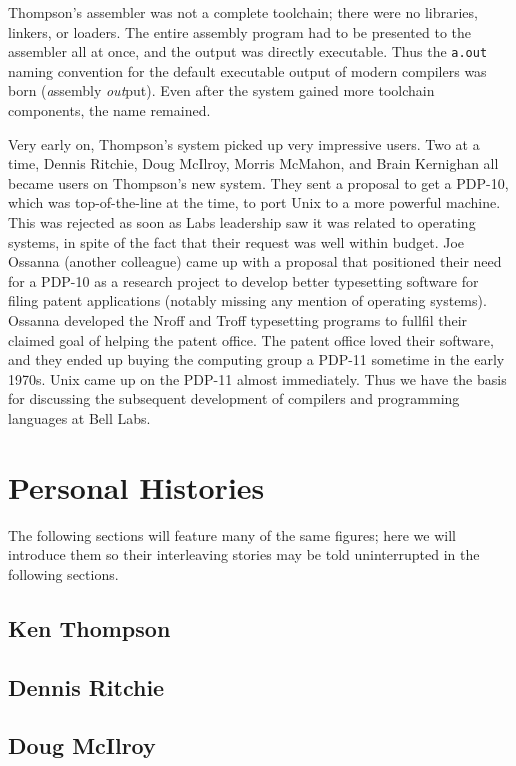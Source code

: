 Thompson's assembler was not a complete toolchain; there were no libraries, linkers, or loaders.
The entire assembly program had to be presented to the assembler all at once,
and the output was directly executable. Thus the \texttt{a.out} naming convention for
the default executable output of modern compilers was born (\textit{a}ssembly \textit{out}put).
Even after the system gained more toolchain components, the name remained.

Very early on, Thompson's system picked up very impressive users.
Two at a time, Dennis Ritchie, Doug McIlroy, Morris McMahon, and Brain Kernighan
all became users on Thompson's new system.
They sent a proposal to get a PDP-10, which was top-of-the-line at the time,
to port Unix to a more powerful machine.
This was rejected as soon as Labs leadership saw it was related to operating systems,
in spite of the fact that their request was well within budget.
Joe Ossanna (another colleague) came up with a proposal that
positioned their need for a PDP-10 as a research project to develop better typesetting
software for filing patent applications (notably missing any mention of operating
systems).
Ossanna developed the Nroff and Troff typesetting programs to fullfil their claimed
goal of helping the patent office.
The patent office loved their software, and they ended up buying the computing group
a PDP-11 sometime in the early 1970s.
Unix came up on the PDP-11 almost immediately.
Thus we have the basis for discussing the subsequent development of compilers
and programming languages at Bell Labs.

\section{Personal Histories}

The following sections will feature many of the same figures;
here we will introduce them so their interleaving stories may be told
uninterrupted in the following sections.


\subsection{Ken Thompson}
\subsection{Dennis Ritchie}
\subsection{Doug McIlroy}

